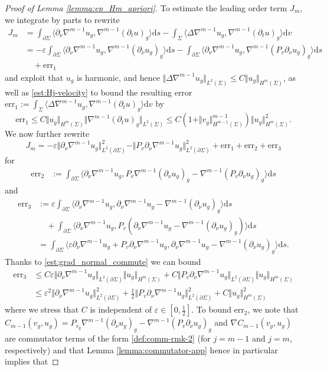 \documentclass[10pt,reqno]{amsart}
\theoremstyle{plain}
\theoremstyle{definition}
\numberwithin{equation}{section}
\newcommand{\Si}{\Sigma}
\newcommand{\ep}{\varepsilon}
\newcommand{\norm}[1]{\Vert#1\Vert}
\newcommand{\beq}{\begin{equation}}
\newcommand{\eeq}{\end{equation}}
\newcommand{\beqas}{\begin{equation*}\begin{aligned}}
\newcommand{\eeqas}{\end{aligned}\end{equation*}}
\newcommand{\half}{\frac{1}{2}}
\newcommand{\dd}{\mathrm{d}} %
\newcommand{\pt}{\partial_t}
\newcommand{\eps}{\varepsilon}
\newcommand{\na}{\nabla}
\newcommand{\p}{\partial} %
\newcommand{\inner}[2]{\langle #1, #2\rangle} %
\newcommand{\err}{\text{err}}
\begin{document}
\begin{proof}[Proof of Lemma \ref{lemma:ep_Hm_apriori}]
	To estimate the leading order term $J_m$, we integrate by parts to rewrite
	\begin{align*}
		J_m &= \int_{\p\Si}\inner{\p_\nu\nabla^{m-1}u_g}{\nabla^{m-1}(\p_tu)_g}\dd s-\int_{\Si}\langle \Delta\na^{m-1} u_g, \nabla^{m-1}(\pt u)_g\rangle \dd v\\
		&= -\ep\int_{\p\Si}\inner{\p_\nu\nabla^{m-1}u_g}{\nabla^{m-1}(\p_\nu u_g)_g}\dd s - \int_{\p\Si}\inner{\p_\nu\nabla^{m-1}u_g}{\nabla^{m-1}(P_{v}\p_\nu u_g)_g}\dd s\\
        &\quad+ \err_1
	\end{align*}
    and exploit that $u_g$ is harmonic, and hence $\norm{\Delta\na^{m-1} u_g}_{L^2(\Si)}\leq C\norm{u_g}_{H^m(\Si)}$, as well as \eqref{est:Hj-velocity} to bound the resulting error $\err_1:= \int_{\Si}\langle \Delta\na^{m-1} u_g, \nabla^{m-1}(\pt u)_g\rangle \dd v $ by 
    \begin{equation}\label{est:Hm_apriori_err1_1}
		\err_1 \leq C\norm{u_g}_{H^m(\Si)}\norm{\nabla^{m-1}(\p_t u)_g}_{L^2(\Si)} \leq C(1 + \norm{v_g}_{H^{m-1}(\Si)}^{m-1})\norm{u_g}_{H^m(\Si)}^2.
	\end{equation}
	We now further rewrite 
	\beq \label{est:Hm_a_priori_Im}
		J_m = -\ep\norm{\p_\nu \nabla^{m-1}u_g}_{L^2(\p\Si)}^2 - \norm{P_{v}\p_\nu \nabla^{m-1}u_g}_{L^2(\p\Si)}^2+ \err_1 + \err_2 + \err_3 %
	\eeq
    for 
    \beqas
		\err_2 &:= \int_{\p\Si}\inner{\p_\nu\nabla^{m-1}u_g}{P_{v}\nabla^{m-1}(\p_\nu u_g)_g - \nabla^{m-1}(P_{v}\p_\nu u_g)_g}\dd s
	\eeqas
    and 
	\beqas
        \err_3 &:= \ep\int_{\p\Si}\inner{\p_\nu\nabla^{m-1}u_g}{\p_\nu\nabla^{m-1}u_g - \nabla^{m-1}(\p_\nu u_g)_g}\dd s \\
        & \quad + \int_{\p\Si}\inner{\p_\nu\nabla^{m-1}u_g}{P_{v}\left(\p_\nu\nabla^{m-1}u_g - \nabla^{m-1}(\p_\nu u_g)_g\right)}\dd s\\
        &= \int_{\p\Si}\inner{\ep \p_\nu\nabla^{m-1}u_g + P_{v}\p_\nu\nabla^{m-1}u_g}{\p_\nu\nabla^{m-1}u_g - \nabla^{m-1}(\p_\nu u_g)_g}\dd s.
    \eeqas
    Thanks to \eqref{est:grad_normal_commute} we can bound 
    \beqas
        \err_3 &\leq C\ep\norm{\p_\nu \nabla^{m-1}u_g}_{L^2(\p\Si)} \norm{u_g}_{H^m(\Si)} + C\norm{P_{v}\p_\nu \nabla^{m-1}u_g}_{L^2(\p\Si)}\norm{u_g}_{H^m(\Si)}\\
        &\leq \eps^2 \norm{\p_\nu \nabla^{m-1}u_g}_{L^2(\p\Si)}^2+\half \norm{P_{v}\p_\nu \nabla^{m-1}u_g}_{L^2(\p\Si)}^2+C \norm{u_g}_{H^m(\Si)}^2
    \eeqas
    where we stress that $C$ is independent of $\eps\in [0,\half]$. To bound $\err_2$, we note that $C_{m-1}(v_g,u_g)= P_{v_g}\nabla^{m-1}(\p_\nu u_g)_g - \nabla^{m-1}(P_{v}\p_\nu u_g)_g$ and $\na C_{m-1}(v_g,u_g)$ are commutator terms of the form \eqref{def:comm-rmk-2}  (for $j=m-1$ and $j=m$, respectively) and that Lemma \ref{lemma:commutator-app} hence in particular implies that

\end{proof}
\end{document}
